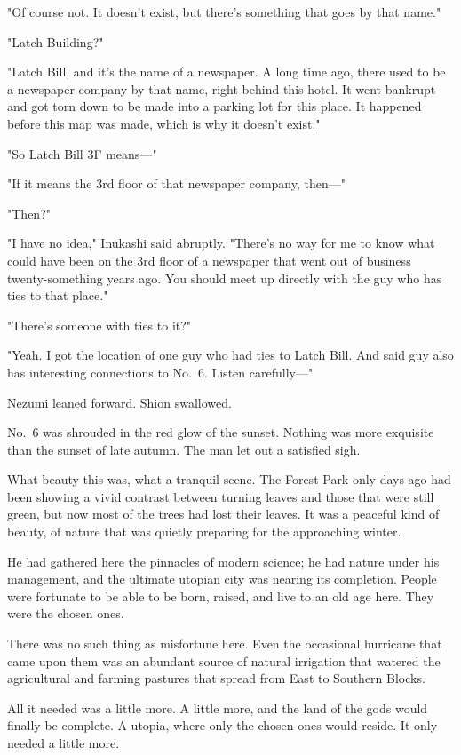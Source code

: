 "Of course not. It doesn't exist, but there's something that goes by
that name."

"Latch Building?"

"Latch Bill, and it's the name of a newspaper. A long time ago, there
used to be a newspaper company by that name, right behind this hotel. It
went bankrupt and got torn down to be made into a parking lot for this
place. It happened before this map was made, which is why it doesn't
exist."

"So Latch Bill 3F means---"

"If it means the 3rd floor of that newspaper company, then---"

"Then?"

"I have no idea," Inukashi said abruptly. "There's no way for me to know
what could have been on the 3rd floor of a newspaper that went out of
business twenty-something years ago. You should meet up directly with
the guy who has ties to that place."

"There's someone with ties to it?"

"Yeah. I got the location of one guy who had ties to Latch Bill. And
said guy also has interesting connections to No.~6. Listen carefully---"

Nezumi leaned forward. Shion swallowed.

\mybreak

No.~6 was shrouded in the red glow of the sunset. Nothing was more
exquisite than the sunset of late autumn. The man let out a satisfied
sigh.

What beauty this was, what a tranquil scene. The Forest Park only days
ago had been showing a vivid contrast between turning leaves and those
that were still green, but now most of the trees had lost their leaves.
It was a peaceful kind of beauty, of nature that was quietly preparing
for the approaching winter.

He had gathered here the pinnacles of modern science; he had nature
under his management, and the ultimate utopian city was nearing its
completion. People were fortunate to be able to be born, raised, and
live to an old age here. They were the chosen ones.

There was no such thing as misfortune here. Even the occasional
hurricane that came upon them was an abundant source of natural
irrigation that watered the agricultural and farming pastures that
spread from East to Southern Blocks.

All it needed was a little more. A little more, and the land of the gods
would finally be complete. A utopia, where only the chosen ones would
reside. It only needed a little more.

